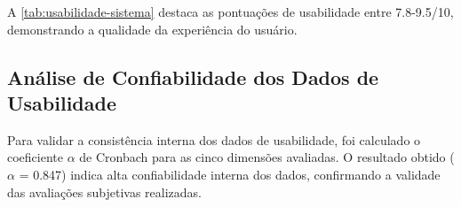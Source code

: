 
A \autoref{tab:usabilidade-sistema} destaca as pontuações de usabilidade entre 7.8-9.5/10, demonstrando a qualidade da experiência do usuário.

\begin{table}[!htbp]
\captionsetup{width=16cm}
\end{table}

\subsection{Análise de Confiabilidade dos Dados de Usabilidade}
\label{subsec:confiabilidade-usabilidade}

Para validar a consistência interna dos dados de usabilidade, foi calculado o coeficiente $ \alpha $ de Cronbach para as cinco dimensões avaliadas. O resultado obtido ($ \alpha $ = 0.847) indica alta confiabilidade interna dos dados, confirmando a validade das avaliações subjetivas realizadas.

